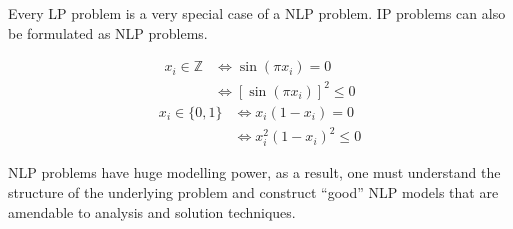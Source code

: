 Every LP problem is a very special case of a NLP problem. IP problems can
also be formulated as NLP problems.
\begin{exbox}
    \begin{example}
        \begin{align*}
            x_i\in\mathbb{Z} & \iff \sin(\pi x_i)=0              \\
                             & \iff [\sin(\pi x_i)]^2\leqslant 0
        \end{align*}
        \begin{align*}
            x_i\in \{0,1\} & \iff x_i(1-x_i)=0              \\
                           & \iff x_i^2(1-x_i)^2\leqslant 0
        \end{align*}

        NLP problems have huge modelling power, as a result, one must understand the
        structure of the underlying problem and construct ``good'' NLP models that are
        amendable to analysis and solution techniques.
    \end{example}
\end{exbox}
